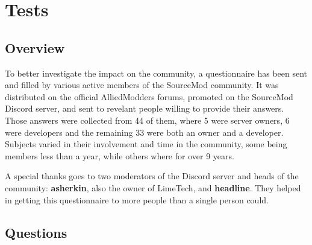 \chapter{Tests}

\section{Overview}

To better investigate the impact on the community, a questionnaire has been sent and filled by various active members of the SourceMod community.
It was distributed on the official AlliedModders forums, promoted on the SourceMod Discord server, and sent to revelant people willing to provide their answers.
Those answers were collected from 44 of them, where 5 were server owners, 6 were developers and the remaining 33 were both an owner and a developer.
Subjects varied in their involvement and time in the community, some being members less than a year, while others where for over 9 years.

A special thanks goes to two moderators of the Discord server and heads of the community: \textbf{asherkin}, also the owner of LimeTech, and \textbf{headline}.
They helped in getting this questionnaire to more people than a single person could.

\section{Questions}

